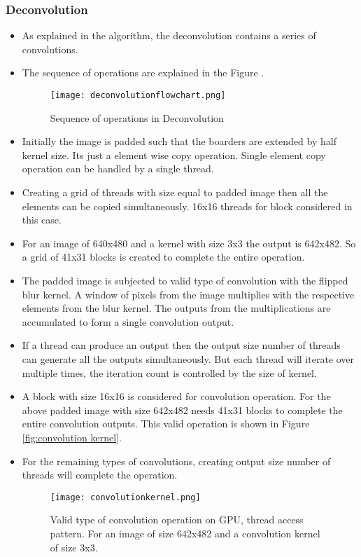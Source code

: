 \subsubsection{Deconvolution}
\begin{itemize}
	\item As explained in the algorithm, the deconvolution contains a series of convolutions.
	\item The sequence of operations are explained in the Figure .
	\begin{figure}[h!]
		\centering
		\texttt{[image: deconvolutionflowchart.png]}
		\caption{Sequence of operations in Deconvolution}
		\label{fig:Deconvolution flow chart}
	\end{figure}
	\item Initially the image is padded such that the boarders are extended by half kernel size. Its just a element wise copy operation. Single element copy operation can be handled by a single thread. 
	\item Creating a grid of threads with size equal to padded image then all the elements can be copied simultaneously. 16x16 threads for block considered in this case.
	\item For an image of 640x480 and a kernel with size 3x3 the output is 642x482. So a grid of 41x31 blocks is created to complete the entire operation.
	\item The padded image is subjected to valid type of convolution with the flipped blur kernel. A window of pixels from the image multiplies with the respective elements from the blur kernel. The outputs from the multiplications are accumulated to form a single convolution output.
	\item If a thread can produce an output then the output size number of threads can generate all the outputs simultaneously. But each thread will iterate over multiple times, the iteration count is controlled by the size of kernel.
	\item A block with size 16x16 is considered for convolution operation. For the above padded image with size 642x482 needs 41x31 blocks to complete the entire convolution outputs. This valid operation is shown in Figure \ref{fig:convolution kernel}.
	\item For the remaining types of convolutions, creating output size number of threads will complete the operation.
	\begin{figure}[h!]
		\centering
		\texttt{[image: convolutionkernel.png]}
		\caption{Valid type of convolution operation on GPU, thread access pattern. For an image of size 642x482 and a convolution kernel of size 3x3.}

\end{figure}
\end{itemize}

